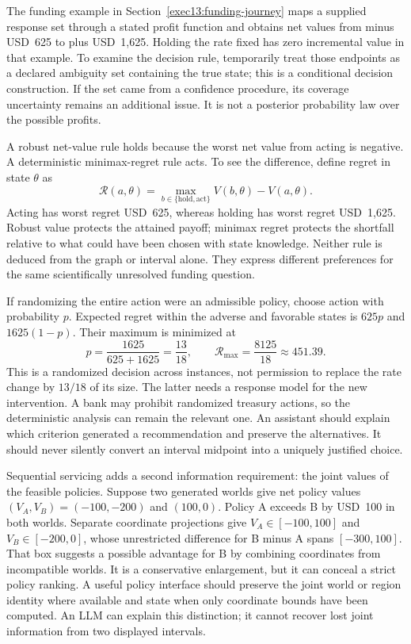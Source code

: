 The funding example in Section~\ref{exec13:funding-journey} maps a supplied
response set through a stated profit function and obtains net values from
minus USD~625 to plus USD~1,625. Holding the rate fixed has zero incremental
value in that example. To examine the decision rule, temporarily treat those
endpoints as a declared ambiguity set containing the true state; this is a
conditional decision construction. If the set came from a confidence procedure,
its coverage uncertainty remains an additional issue. It is not a posterior
probability law over the possible profits.

A robust net-value rule holds because the worst net value from acting is
negative. A deterministic minimax-regret rule acts. To see the difference,
define regret in state $\theta$ as
\[
 \mathcal R(a,\theta)=\max_{b\in\{\mathrm{hold},\mathrm{act}\}}
          V(b,\theta)-V(a,\theta).
\]
Acting has worst regret USD~625, whereas holding has worst regret USD~1,625.
Robust value protects the attained payoff; minimax regret protects the shortfall
relative to what could have been chosen with state knowledge. Neither rule is
deduced from the graph or interval alone. They express different preferences
for the same scientifically unresolved funding question.

If randomizing the entire action were an admissible policy, choose action with
probability $p$. Expected regret within the adverse and favorable states is
$625p$ and $1625(1-p)$. Their maximum is minimized at
\[
 p=\frac{1625}{625+1625}=\frac{13}{18},
 \qquad \mathcal R_{\max}=\frac{8125}{18}\approx451.39.
\]
This is a randomized decision across instances, not permission to replace the
rate change by $13/18$ of its size. The latter needs a response model for the
new intervention. A bank may prohibit randomized treasury actions, so the
deterministic analysis can remain the relevant one. An assistant should explain
which criterion generated a recommendation and preserve the alternatives.
It should never silently convert an interval midpoint into a uniquely justified
choice. \citep{exec14_l8_economics,exec13_funding_exact}

Sequential servicing adds a second information requirement: the joint values
of the feasible policies. Suppose two generated worlds give net policy values
$(V_A,V_B)=(-100,-200)$ and $(100,0)$. Policy A exceeds B by USD~100 in both
worlds. Separate coordinate projections give $V_A\in[-100,100]$ and
$V_B\in[-200,0]$, whose unrestricted difference for B minus A spans $[-300,100]$. That
box suggests a possible advantage for B by combining coordinates from
incompatible worlds. It is a conservative enlargement, but it can conceal a
strict policy ranking. A useful policy interface should preserve the joint
world or region identity where available and state when only coordinate
bounds have been computed. An LLM can explain this distinction; it cannot
recover lost joint information from two displayed intervals.
\citep{exec14_l8_economics}

